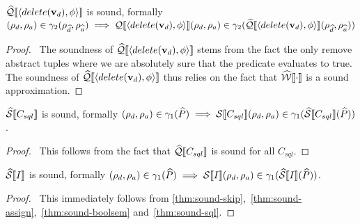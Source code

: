 \begin{conjecture}\label{thm:sound-update}
    $\widehat{\mathcal{Q}}\llbracket \langle delete(\mathbf{v}_d), \phi \rangle \rrbracket$ is sound, formally $(\rho_d, \rho_a) \in \gamma_2(\rho_{\widehat{d}}, \rho_{\widehat{a}}) \implies \mathcal{Q}\llbracket \langle delete(\mathbf{v}_d), \phi \rangle \rrbracket(\rho_d, \rho_a) \in \gamma_2(\widehat{\mathcal{Q}}\llbracket \langle delete(\mathbf{v}_d), \phi \rangle \rrbracket(\rho_{\widehat{d}}, \rho_{\widehat{a}}))$
\end{conjecture}


\begin{proof}
    \pfsketch\
    The soundness of $\widehat{\mathcal{Q}}\llbracket \langle delete(\mathbf{v}_d), \phi \rangle \rrbracket$ stems from the fact the only remove abstract tuples where we are absolutely sure that the predicate evaluates to true.
    The soundness of $\widehat{\mathcal{Q}}\llbracket \langle delete(\mathbf{v}_d), \phi \rangle \rrbracket$ thus relies on the fact that $\widehat{\mathcal{W}}\llbracket \cdot \rrbracket$ is a sound approximation.
\end{proof}


\begin{conjecture}\label{thm:sound-sql}
    $\widehat{\mathcal{S}} \llbracket C_{sql} \rrbracket$ is sound, formally $(\rho_d, \rho_a) \in \gamma_1(\widehat{P}) \implies \mathcal{S} \llbracket C_{sql} \rrbracket(\rho_d, \rho_a) \in \gamma_1(\widehat{\mathcal{S}} \llbracket C_{sql} \rrbracket(\widehat{P}))$.
\end{conjecture}


\begin{proof}
    \pf\
    This follows from the fact that $\widehat{\mathcal{Q}}\llbracket C_{sql} \rrbracket$ is sound for all $C_{sql}$.
\end{proof}


\begin{conjecture}
    $\widehat{\mathcal{S}} \llbracket I \rrbracket$ is sound, formally $(\rho_d, \rho_a) \in \gamma_1(\widehat{P}) \implies \mathcal{S} \llbracket I \rrbracket(\rho_d, \rho_a) \in \gamma_1(\widehat{\mathcal{S}} \llbracket I \rrbracket(\widehat{P}))$.
\end{conjecture}


\begin{proof}
    \pf\
    This immediately follows from \autoref{thm:sound-skip},~\ref{thm:sound-assign},~\ref{thm:sound-boolsem} and~\ref{thm:sound-sql}.
\end{proof}
